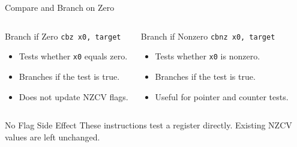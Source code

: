\documentclass[aspectratio=169,11pt,t]{beamer}
\newcommand{\code}[1]{\texttt{#1}}
\begin{document}
\begin{frame}{Compare and Branch on Zero}
\begin{columns}[T,onlytextwidth]
\begin{block}{Branch if Zero}
\large
\hspace{1.5cm}\code{cbz x0, target}
\normalsize
\begin{itemize}
\item Tests whether \code{x0} equals zero.
\item Branches if the test is true.
\item Does not update NZCV flags.
\end{itemize}
\end{block}
\begin{block}{Branch if Nonzero}
\large
\hspace{1.4cm}\code{cbnz x0, target}
\normalsize
\begin{itemize}
\item Tests whether \code{x0} is nonzero.
\item Branches if the test is true.
\item Useful for pointer and counter tests.
\end{itemize}
\end{block}
\end{columns}
\vspace{0.25cm}
\begin{block}{No Flag Side Effect}
These instructions test a register directly. Existing NZCV values are left unchanged.
\end{block}
\end{frame}



\end{document}
